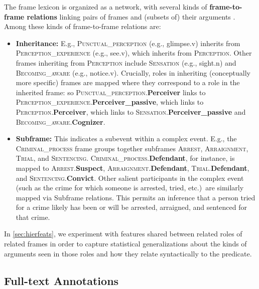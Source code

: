 \documentclass[11pt,a4paper]{article}
\newcommand{\fnf}[1]{\textsc{\textsf{#1}}} %
\newcommand{\fnr}[1]{\textbf{\textsf{#1}}} %
\newcommand{\fnlu}[1]{\textsf{#1}} %
\begin{document}
The frame lexicon is organized as a network, with several kinds of \textbf{frame-to-frame relations} 
linking pairs of frames and (subsets of) their arguments \citep{ruppenhofer-10}. 
Among these kinds of frame-to-frame relations are:
\begin{itemize}
\item \textbf{Inheritance:} E.g., \fnf{Punctual\_perception} (e.g., \fnlu{glimpse.v}) inherits from 
\fnf{Perception\_experience} (e.g., \fnlu{see.v}), which inherits from \fnf{Perception}. 
Other frames inheriting from \fnf{Perception} include \fnf{Sensation} (e.g., \fnlu{sight.n}) and 
\fnf{Becoming\_aware} (e.g., \fnlu{notice.v}). Crucially, roles in inheriting (conceptually more specific) frames are mapped 
where they correspond to a role in the inherited frame: so \fnf{Punctual\_perception}.\fnr{Perceiver} links to \fnf{Perception\_experience}.\fnr{Perceiver\_passive}, 
which links to \fnf{Perception}.\fnr{Perceiver}, which links to \fnf{Sensation}.\fnr{Perceiver\_passive} and \fnf{Becoming\_aware}.\fnr{Cognizer}.
\item \textbf{Subframe:} This indicates a subevent within a complex event. 
E.g., the \fnf{Criminal\_process} frame groups together subframes 
\fnf{Arrest}, \fnf{Arraignment}, \fnf{Trial}, and \fnf{Sentencing}. 
\fnf{Criminal\_process}.\fnr{Defendant}, for instance, is mapped to 
\fnf{Arrest}.\fnr{Suspect}, \fnf{Arraignment}.\fnr{Defendant}, 
\fnf{Trial}.\fnr{Defendant}, and \fnf{Sentencing}.\fnr{Convict}. 
Other salient participants in the complex event (such as the crime for which someone is arrested, 
tried, etc.)\ are similarly mapped via Subframe relations.
This permits an inference that a person tried for a crime likely
has been or will be arrested, arraigned, and sentenced for that crime.
\end{itemize}
In \cref{sec:hierfeats}, we experiment with features shared between related roles of related frames 
in order to capture statistical generalizations about the kinds of arguments 
seen in those roles and how they relate syntactically to the predicate.

\subsection{Full-text Annotations}\label{sec:ft}
\end{document}
